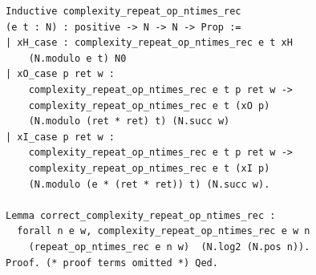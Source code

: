\begin{lstlisting}[frame=single, language=Coq, caption={Extractor Complexity},
  label={extractor_complex},captionpos=t, basicstyle=\ttfamily\scriptsize,
  abovecaptionskip=-\medskipamount]
Inductive complexity_repeat_op_ntimes_rec 
(e t : N) : positive -> N -> N -> Prop :=
| xH_case : complexity_repeat_op_ntimes_rec e t xH 
    (N.modulo e t) N0
| xO_case p ret w : 
    complexity_repeat_op_ntimes_rec e t p ret w ->
    complexity_repeat_op_ntimes_rec e t (xO p) 
    (N.modulo (ret * ret) t) (N.succ w)
| xI_case p ret w : 
    complexity_repeat_op_ntimes_rec e t p ret w ->
    complexity_repeat_op_ntimes_rec e t (xI p) 
    (N.modulo (e * (ret * ret)) t) (N.succ w).

Lemma correct_complexity_repeat_op_ntimes_rec : 
  forall n e w, complexity_repeat_op_ntimes_rec e w n 
    (repeat_op_ntimes_rec e n w)  (N.log2 (N.pos n)).
Proof. (* proof terms omitted *) Qed.
\end{lstlisting}

